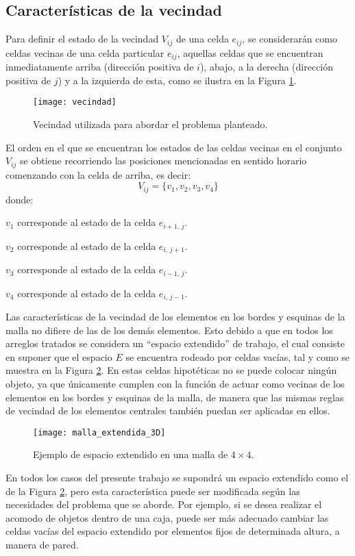 \subsection{Características de la vecindad}
\label{subsec:vecindad}
%
%
Para definir el estado de la vecindad $V_{ij}$ de una celda $e_{ij}$, se considerarán como celdas vecinas de una celda particular $e_{ij}$, aquellas celdas que se encuentran inmediatamente arriba (dirección positiva de $i$), abajo, a la derecha (dirección positiva de $j$) y a la izquierda de esta, como se ilustra en la Figura \ref{fig:vecindad}.
%
\begin{figure}[H]
	\texttt{[image: vecindad]}%
	\caption{Vecindad utilizada para abordar el problema planteado.}%
	\label{fig:vecindad}%
\end{figure}
%
El orden en el que se encuentran los estados de las celdas vecinas en el conjunto $V_{ij}$ se obtiene recorriendo las posiciones mencionadas en sentido horario comenzando con la celda de arriba, es decir:
%
\begin{equation}
	\label{eq:vecindad_usada}
	V_{ij} = \{v_1, v_2, v_3, v_4\}
\end{equation}
%
donde:
%
\begin{descriptionParams}
	\item[$v_1$] corresponde al estado de la celda $e_{i+1,\, j}$.
	\item[$v_2$] corresponde al estado de la celda $e_{i,\, j+1}$.
	\item[$v_3$] corresponde al estado de la celda $e_{i-1,\, j}$.
	\item[$v_4$] corresponde al estado de la celda $e_{i,\, j-1}$.
\end{descriptionParams}
%
Las características de la vecindad de los elementos en los bordes y esquinas de la malla no difiere de las de los demás elementos.
Esto debido a que en todos los arreglos tratados se considera un ``espacio extendido'' de trabajo, el cual consiste en suponer que el espacio $E$ se encuentra rodeado por celdas vacías, tal y como se muestra en la Figura \ref{fig:malla_extendida}.
En estas celdas hipotéticas no se puede colocar ningún objeto, ya que únicamente cumplen con la función de actuar como vecinas de los elementos en los bordes y esquinas de la malla, de manera que las mismas reglas de vecindad de los elementos centrales también puedan ser aplicadas en ellos.
%
\begin{figure}[H]
	\texttt{[image: malla\_extendida\_3D]}%
	\caption{Ejemplo de espacio extendido en una malla de $4\times 4$.}%
	\label{fig:malla_extendida}%
\end{figure}
%
En todos los casos del presente trabajo se supondrá un espacio extendido como el de la Figura \ref{fig:malla_extendida}, pero esta característica puede ser modificada según las necesidades del problema que se aborde.
Por ejemplo, si se desea realizar el acomodo de objetos dentro de una caja, puede ser más adecuado cambiar las celdas vacías del espacio extendido por elementos fijos de determinada altura, a manera de pared.
%
%
